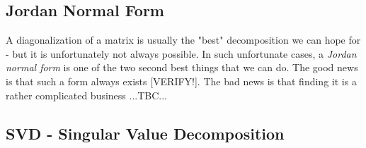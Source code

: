 


\subsection{Jordan Normal Form}
A diagonalization of a matrix is usually the "best" decomposition we can hope for - but it is unfortunately not always possible. In such unfortunate cases, a \emph{Jordan normal form} is one of the two second best things that we can do. The good news is that such a form always exists [VERIFY!]. The bad news is that finding it is a rather complicated business ...TBC...











\subsection{SVD - Singular Value Decomposition}

